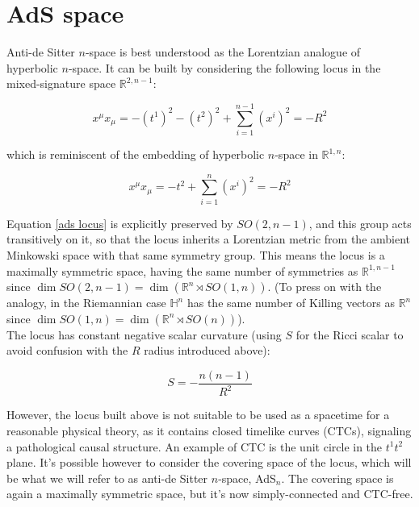 
\section{AdS space}

Anti-de Sitter $n$-space is best understood as the Lorentzian analogue of hyperbolic $n$-space. It can be built by considering the following locus in the mixed-signature space $\mathbb{R}^{2,n-1}$:

\begin{equation} \label{ads locus}
x^\mu x_\mu = -(t^1)^2 - (t^2)^2 + \sum_{i=1}^{n-1} (x^i)^2  =  - R^2
\end{equation}

which is reminiscent of the embedding of hyperbolic $n$-space in $\mathbb{R}^{1,n}$:

\begin{equation}
x^\mu x_\mu = -t^2 + \sum_{i=1}^{n} (x^i)^2 = - R^2
\end{equation}

Equation \ref{ads locus} is explicitly preserved by $SO(2,n-1)$, and this group acts transitively on it, so that the locus inherits a Lorentzian metric from the ambient Minkowski space with that same symmetry group. This means the locus is a maximally symmetric space, having the same number of symmetries as $\mathbb{R}^{1,n-1}$ since $\dim SO(2,n-1) = \dim \left( \mathbb{R}^n \rtimes SO(1,n) \right)$. (To press on with the analogy, in the Riemannian case $\mathbb{H}^n$ has the same number of Killing vectors as $\mathbb{R}^n$ since $\dim SO(1,n) = \dim \left(\mathbb{R}^n \rtimes SO(n) \right)$).\\

The locus has constant negative scalar curvature (using $S$ for the Ricci scalar to avoid confusion with the $R$ radius introduced above):

\begin{equation}
S = - \frac{n(n-1)}{R^2} 
\end{equation}

However, the locus built above is not suitable to be used as a spacetime for a reasonable physical theory, as it contains closed timelike curves (CTCs), signaling a pathological causal structure. An example of CTC is the unit circle in the $t^1 t^2$ plane. It's possible however to consider the covering space of the locus, which will be what we will refer to as anti-de Sitter $n$-space, AdS$_n$. The covering space is again a maximally symmetric space, but it's now simply-connected and CTC-free.\\

